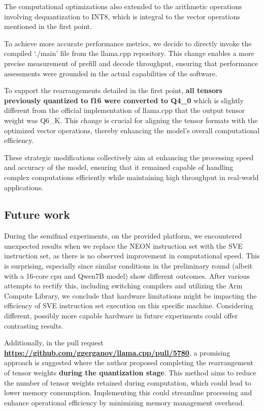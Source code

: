 \documentclass[conference]{IEEEtran}
\begin{document}
The computational optimizations also extended to the arithmetic operations involving dequantization to INT8, which is integral to the vector operations mentioned in the first point. 

To achieve more accurate performance metrics, we decide to directly invoke the compiled `./main' file from the llama.cpp repository. This change enables a more precise measurement of prefill and decode throughput, ensuring that performance assessments were grounded in the actual capabilities of the software.

To support the rearrangements detailed in the first point, \textbf{all tensors previously quantized to f16 were converted to Q4\_0} which is slightly different from the official implementation of llama.cpp that the output tensor weight was Q6\_K. This change is crucial for aligning the tensor formats with the optimized vector operations, thereby enhancing the model's overall computational efficiency.

These strategic modifications collectively aim at enhancing the processing speed and accuracy of the model, ensuring that it remained capable of handling complex computations efficiently while maintaining high throughput in real-world applications.

\subsection{Future work}
During the semifinal experiments, on the provided platform, we encountered unexpected results when we replace the NEON instruction set with the SVE instruction set, as there is no observed improvement in computational speed. This is surprising, especially since similar conditions in the preliminary round (albeit with a 16-core cpu and Qwen7B model) show different outcomes. After various attempts to rectify this, including switching compilers and utilizing the Arm Compute Library, we conclude that hardware limitations might be impacting the efficiency of SVE instruction set execution on this specific machine. Considering different, possibly more capable hardware in future experiments could offer contrasting results.

Additionally, in the pull request \textbf{\url{https://github.com/ggerganov/llama.cpp/pull/5780}}, a promising approach is suggested where the author proposed completing the rearrangement of tensor weights \textbf{during the quantization stage}. This method aims to reduce the number of tensor weights retained during computation, which could lead to lower memory consumption. Implementing this could streamline processing and enhance operational efficiency by minimizing memory management overhead.
\end{document}
